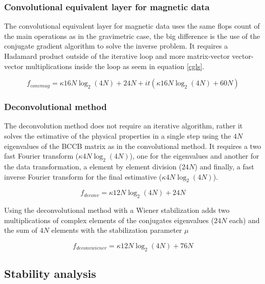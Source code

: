 \subsubsection{Convolutional equivalent layer for magnetic data \citep{takahashi2022}}

The convolutional equivalent layer for magnetic data uses the same flops count of the main operations as in the gravimetric case, the big difference is the use of the conjugate gradient algorithm to solve the inverse problem.
It requires a Hadamard product outside of the iterative loop and more matrix-vector vector-vector multiplications inside the loop as seem in equation \ref{cgls}.

\begin{equation}
	f_{convmag} = \kappa16N\log_2(4N) + 24N + it(\kappa16N\log_2(4N) + 60N)
\label{convmag}
\end{equation}

\subsubsection{Deconvolutional method}

The deconvolution method does not require an iterative algorithm, rather it solves the estimative of the physical properties in a single step using the $4N$ eigenvalues of the BCCB matrix as in the convolutional method. It requires a two fast Fourier transform ($\kappa4N\log_2(4N)$), one for the eigenvalues and another for the data transformation, a element by element division ($24N$) and finally, a fast inverse Fourier transform for the final estimative ($\kappa4N\log_2(4N)$).

\begin{equation}
	f_{deconv} = \kappa12N\log_2(4N) + 24N
	\label{deconv}
\end{equation}

Using the deconvolutional method with a Wiener stabilization adds two multiplications of complex elements of the conjugates eigenvalues ($24N$ each) and the sum of $4N$ elements with the stabilization parameter $\mu$

\begin{equation}
	f_{deconvwiener} = \kappa12N\log_2(4N) + 76N
	\label{deconvwiener}
\end{equation}

\subsection{Stability analysis}

